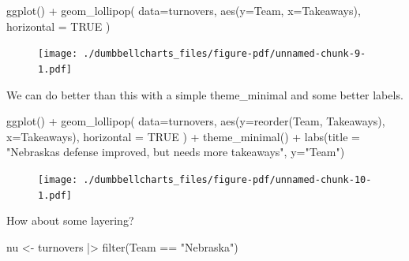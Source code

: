 \documentclass[
  letterpaper,
  DIV=11,
  numbers=noendperiod]{scrreprt}
\newenvironment{Shaded}{\begin{snugshade}}{\end{snugshade}}
\newcommand{\AttributeTok}[1]{\textcolor[rgb]{0.40,0.45,0.13}{#1}}
\newcommand{\ConstantTok}[1]{\textcolor[rgb]{0.56,0.35,0.01}{#1}}
\newcommand{\FunctionTok}[1]{\textcolor[rgb]{0.28,0.35,0.67}{#1}}
\newcommand{\NormalTok}[1]{\textcolor[rgb]{0.00,0.23,0.31}{#1}}
\newcommand{\OtherTok}[1]{\textcolor[rgb]{0.00,0.23,0.31}{#1}}
\newcommand{\SpecialCharTok}[1]{\textcolor[rgb]{0.37,0.37,0.37}{#1}}
\newcommand{\StringTok}[1]{\textcolor[rgb]{0.13,0.47,0.30}{#1}}
\begin{document}
\begin{Shaded}
\begin{Highlighting}[]
\FunctionTok{ggplot}\NormalTok{() }\SpecialCharTok{+} 
  \FunctionTok{geom\_lollipop}\NormalTok{(}
    \AttributeTok{data=}\NormalTok{turnovers, }
    \FunctionTok{aes}\NormalTok{(}\AttributeTok{y=}\NormalTok{Team, }\AttributeTok{x=}\NormalTok{Takeaways), }
    \AttributeTok{horizontal =} \ConstantTok{TRUE}
\NormalTok{    )}
\end{Highlighting}
\end{Shaded}

\begin{figure}[H]

{\centering \texttt{[image: ./dumbbellcharts\_files/figure-pdf/unnamed-chunk-9-1.pdf]}

}

\end{figure}

We can do better than this with a simple theme\_minimal and some better
labels.

\begin{Shaded}
\begin{Highlighting}[]
\FunctionTok{ggplot}\NormalTok{() }\SpecialCharTok{+} 
  \FunctionTok{geom\_lollipop}\NormalTok{(}
    \AttributeTok{data=}\NormalTok{turnovers, }
    \FunctionTok{aes}\NormalTok{(}\AttributeTok{y=}\FunctionTok{reorder}\NormalTok{(Team, Takeaways), }\AttributeTok{x=}\NormalTok{Takeaways), }
    \AttributeTok{horizontal =} \ConstantTok{TRUE}
\NormalTok{    ) }\SpecialCharTok{+} \FunctionTok{theme\_minimal}\NormalTok{() }\SpecialCharTok{+} 
  \FunctionTok{labs}\NormalTok{(}\AttributeTok{title =} \StringTok{"Nebraska\textquotesingle{}s defense improved, but needs more takeaways"}\NormalTok{, }\AttributeTok{y=}\StringTok{"Team"}\NormalTok{)}
\end{Highlighting}
\end{Shaded}

\begin{figure}[H]

{\centering \texttt{[image: ./dumbbellcharts\_files/figure-pdf/unnamed-chunk-10-1.pdf]}

}

\end{figure}

How about some layering?

\begin{Shaded}
\begin{Highlighting}[]
\NormalTok{nu }\OtherTok{\textless{}{-}}\NormalTok{ turnovers }\SpecialCharTok{|\textgreater{}} \FunctionTok{filter}\NormalTok{(Team }\SpecialCharTok{==} \StringTok{"Nebraska"}\NormalTok{)}
\end{Highlighting}
\end{Shaded}
\end{document}
